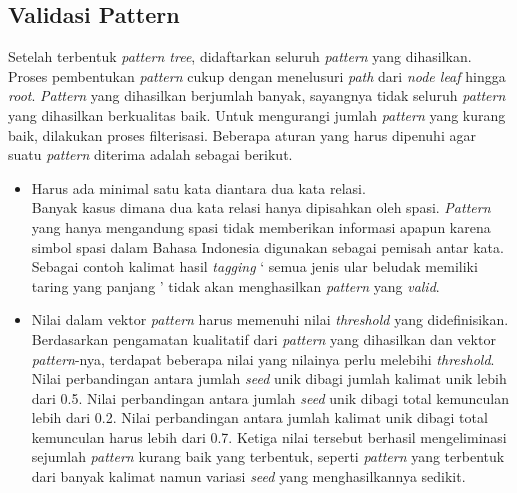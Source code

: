 \subsection{Validasi Pattern}
Setelah terbentuk \textit{pattern tree}, didaftarkan seluruh \textit{pattern} yang dihasilkan. Proses pembentukan \textit{pattern} cukup dengan menelusuri \textit{path} dari \textit{node leaf} hingga \textit{root}. \textit{Pattern} yang dihasilkan berjumlah banyak, sayangnya tidak seluruh \textit{pattern} yang dihasilkan berkualitas baik. Untuk mengurangi jumlah \textit{pattern} yang kurang baik, dilakukan proses filterisasi. Beberapa aturan yang harus dipenuhi agar suatu \textit{pattern} diterima adalah sebagai berikut.

\begin{itemize}
  \item Harus ada minimal satu kata diantara dua kata relasi. \\
  Banyak kasus dimana dua kata relasi hanya dipisahkan oleh spasi. \textit{Pattern} yang hanya mengandung spasi tidak memberikan informasi apapun karena simbol spasi dalam Bahasa Indonesia digunakan sebagai pemisah antar kata. Sebagai contoh kalimat hasil \textit{tagging} `{\tagStart} semua jenis {\tagHypernym}ular{\tagHypernym} {\tagHyponym}beludak{\tagHyponym} memiliki taring yang panjang {\tagEnd}' tidak akan menghasilkan \textit{pattern} yang \textit{valid}.
  \item Nilai dalam vektor \textit{pattern} harus memenuhi nilai \textit{threshold} yang didefinisikan. \\
  Berdasarkan pengamatan kualitatif dari \textit{pattern} yang dihasilkan dan vektor \textit{pattern}-nya, terdapat beberapa nilai yang nilainya perlu melebihi \textit{threshold}. Nilai perbandingan antara jumlah \textit{seed} unik dibagi jumlah kalimat unik lebih dari 0.5. Nilai perbandingan antara jumlah \textit{seed} unik dibagi total kemunculan lebih dari 0.2. Nilai perbandingan antara jumlah kalimat unik dibagi total kemunculan harus lebih dari 0.7. Ketiga nilai tersebut berhasil mengeliminasi sejumlah \textit{pattern} kurang baik yang terbentuk, seperti \textit{pattern} yang terbentuk dari banyak kalimat namun variasi \textit{seed} yang menghasilkannya sedikit.
\end{itemize}

